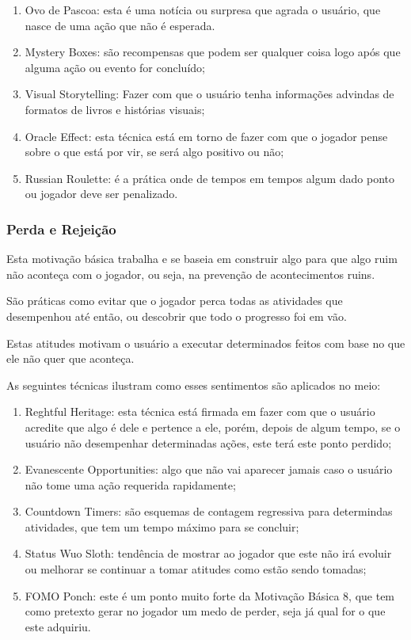 \begin{enumerate}
    \item Ovo de Pascoa: esta é uma notícia ou surpresa que agrada o usuário,
        que nasce de uma ação que não é esperada.
    \item Mystery Boxes: são recompensas que podem ser qualquer coisa
        logo após que alguma ação ou evento for concluído;
    \item Visual Storytelling: Fazer com que o usuário tenha informações
        advindas de formatos de livros e histórias
        visuais;
    \item Oracle Effect: esta técnica está em torno de fazer com que o
        jogador pense sobre o que está por vir, se será algo positivo ou não;
    \item Russian Roulette: é a prática onde de tempos em tempos algum dado ponto
        ou jogador deve ser penalizado.
\end{enumerate}

\subsubsection{Perda e Rejeição}
\label{sub:perdaerejeicao}
Esta motivação básica trabalha e se baseia em construir algo para que algo ruim não
aconteça com o jogador, ou seja, na prevenção de acontecimentos ruins.

São práticas como evitar que o jogador perca todas as atividades que desempenhou
até então, ou descobrir que todo o progresso foi em vão.

Estas atitudes motivam o usuário a executar determinados feitos com base no que
ele não quer que aconteça.

As seguintes técnicas ilustram como esses sentimentos são aplicados no meio:

\begin{enumerate}
    \item Reghtful Heritage: esta técnica está firmada em fazer com que o usuário
        acredite que algo é dele e pertence a ele, porém, depois de algum tempo,
        se o usuário não desempenhar determinadas ações, este terá este ponto
        perdido;
    \item Evanescente Opportunities: algo que não vai aparecer jamais
        caso o usuário não tome uma ação requerida rapidamente;
    \item Countdown Timers: são esquemas de contagem regressiva para determindas
        atividades, que tem um tempo máximo para se concluir;
    \item Status Wuo Sloth: tendência de mostrar ao jogador que este não irá evoluir ou melhorar se continuar
        a tomar atitudes como estão sendo tomadas;
    \item FOMO Ponch: este é um ponto muito forte da Motivação Básica 8, que tem como
        pretexto gerar no jogador um medo de perder, seja já qual for o que
        este adquiriu.
\end{enumerate}

